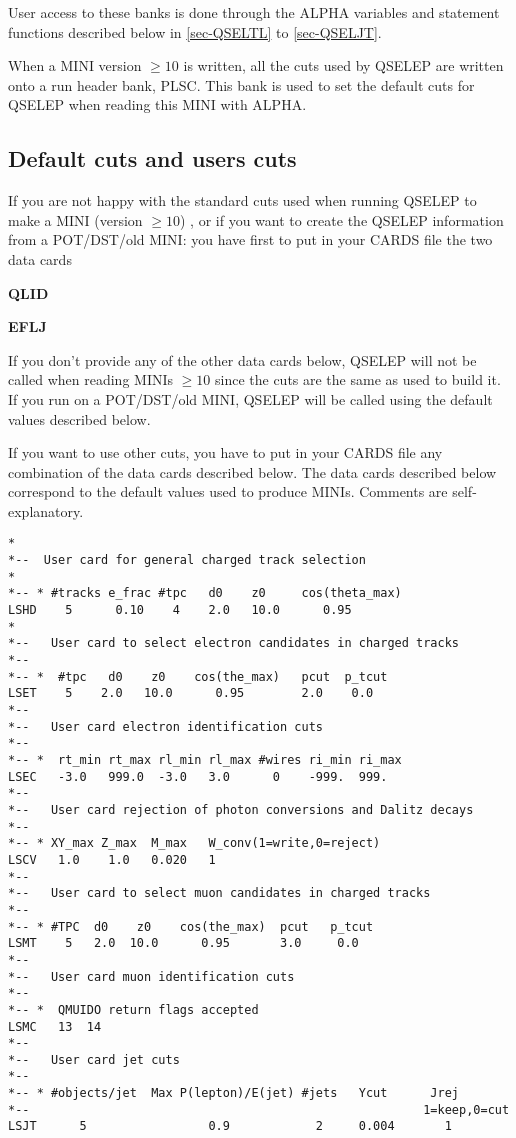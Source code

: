       User access to these banks is done through the ALPHA variables and statement functions
      described below in \ref{sec-QSELTL} to \ref{sec-QSELJT}.
 
      When a MINI version $\geq 10$ is written,
      all the cuts used by QSELEP are written onto a run header
      bank, PLSC. This bank is used to set the default cuts for QSELEP when reading this MINI with ALPHA.
 
\subsection{\label{sec-QSELCU}Default cuts and users cuts}
 
         If you are not happy with the standard cuts used when running QSELEP to make a MINI
         (version $\geq 10$) , or if you want to create
                          the QSELEP information from a POT/DST/old MINI:
            you have first to put in your CARDS file the two data cards
 
  {\bf   QLID}
 
  {\bf   EFLJ}
 
         If you don't provide any of the other data cards below, QSELEP will
         not be called when reading MINIs $\geq 10$ since the cuts are the same as used to build it.
         If you run on a POT/DST/old MINI, QSELEP will be called using
         the default values described below.
 
         If you want to use other cuts, you have to put in your CARDS file
         any combination of the data cards
         described below.  
         The data cards described below correspond to the default values used
         to produce MINIs.  Comments are self-explanatory.
\begin{verbatim}
*
*--  User card for general charged track selection
*
*-- * #tracks e_frac #tpc   d0    z0     cos(theta_max)
LSHD    5      0.10    4    2.0   10.0      0.95
*
*--   User card to select electron candidates in charged tracks
*--
*-- *  #tpc   d0    z0    cos(the_max)   pcut  p_tcut
LSET    5    2.0   10.0      0.95        2.0    0.0
*--
*--   User card electron identification cuts
*--
*-- *  rt_min rt_max rl_min rl_max #wires ri_min ri_max
LSEC   -3.0   999.0  -3.0   3.0      0    -999.  999.
*--
*--   User card rejection of photon conversions and Dalitz decays
*--
*-- * XY_max Z_max  M_max   W_conv(1=write,0=reject)
LSCV   1.0    1.0   0.020   1
*--
*--   User card to select muon candidates in charged tracks
*--
*-- * #TPC  d0    z0    cos(the_max)  pcut   p_tcut
LSMT    5   2.0  10.0      0.95       3.0     0.0
*--
*--   User card muon identification cuts
*--
*-- *  QMUIDO return flags accepted
LSMC   13  14
*--
*--   User card jet cuts
*--
*-- * #objects/jet  Max P(lepton)/E(jet) #jets   Ycut      Jrej
*--                                                       1=keep,0=cut
LSJT      5                 0.9            2     0.004       1
 
\end{verbatim}
 
